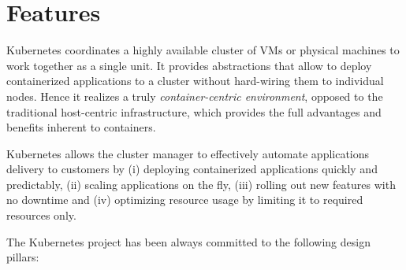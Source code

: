 \section{Features}
\label{Sec:features}

Kubernetes coordinates a highly available cluster of VMs or physical machines to work together as a single unit. 
%
It provides abstractions that allow to deploy containerized applications to a cluster without hard-wiring them to individual nodes.
%
Hence it realizes a truly \textit{container-centric environment}, opposed to the traditional host-centric infrastructure, which provides the full advantages and benefits inherent to containers.

Kubernetes allows the cluster manager to effectively automate applications delivery to customers by 
(i) deploying containerized applications quickly and predictably,
(ii) scaling applications on the fly,
(iii) rolling out new features with no downtime and
(iv) optimizing resource usage by limiting it to required resources only.


The Kubernetes project has been always committed to the following design pillars:

